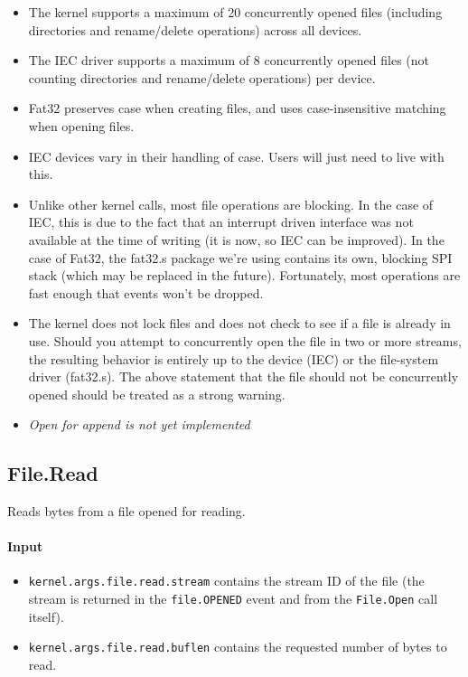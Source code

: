 \begin{itemize}
\item The kernel supports a maximum of 20 concurrently opened files (including directories and rename/delete operations) across all devices.
\item The IEC driver supports a maximum of 8 concurrently opened files (not counting directories and rename/delete operations) per device. 
\item Fat32 preserves case when creating files, and uses case-insensitive matching when opening files.
\item IEC devices vary in their handling of case.  Users will just need to live with this.
\item Unlike other kernel calls, most file operations are blocking.  In the case of IEC, this is due to the fact that an interrupt driven interface was not available at the time of writing (it is now, so IEC can be improved).  In the case of Fat32, the fat32.s package we're using contains its own, blocking SPI stack (which may be replaced in the future).  Fortunately, most operations are fast enough that events won't be dropped.
\item The kernel does not lock files and does not check to see if a file is already in use.  Should you attempt to concurrently open the file in two or more streams, the resulting behavior is entirely up to the device (IEC) or the file-system driver (fat32.s).  The above statement that the file should not be concurrently opened should be treated as a strong warning. 
\item {\em Open for append is not yet implemented}
\end{itemize}


\subsection*{File.Read}
Reads bytes from a file opened for reading.

\paragraph{Input}

\begin{itemize}
\item \verb+kernel.args.file.read.stream+ contains the stream ID of the file (the stream is returned in the \verb+file.OPENED+ event and from the \verb+File.Open+ call itself).
\item \verb+kernel.args.file.read.buflen+ contains the requested number of bytes to read.
\end{itemize}

